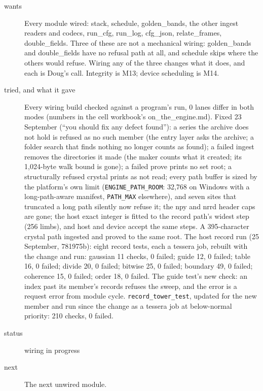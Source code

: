 \begin{description}
\item[{wants}] Every module wired: stack, schedule, golden\_\allowbreak{}bands, the other ingest readers and codecs, run\_\allowbreak{}cfg, run\_\allowbreak{}log, cfg\_\allowbreak{}json, relate\_\allowbreak{}frames, double\_\allowbreak{}fields. Three of these are not a mechanical wiring: golden\_\allowbreak{}bands and double\_\allowbreak{}fields have no refusal path at all, and schedule skips where the others would refuse. Wiring any of the three changes what it does, and each is Doug's call. Integrity is M13; device scheduling is M14.
\item[{tried, and what it gave}] Every wiring build checked against a program's run, 0 lanes differ in both modes (numbers in the cell workbook's on\_\allowbreak{}the\_\allowbreak{}engine.md). Fixed 23 September (“you should fix any defect found”): a series the archive does not hold is refused as no such member (the entry layer asks the archive; a folder search that finds nothing no longer counts as found); a failed ingest removes the directories it made (the maker counts what it created; its 1,024-byte walk bound is gone); a failed prove prints no set root; a structurally refused crystal prints as not read; every path buffer is sized by the platform's own limit (\texttt{ENGINE\_\allowbreak{}PATH\_\allowbreak{}ROOM}: 32,768 on Windows with a long-path-aware manifest, \texttt{PATH\_\allowbreak{}MAX} elsewhere), and seven sites that truncated a long path silently now refuse it; the npy and nrrd header caps are gone; the host exact integer is fitted to the record path's widest step (256 limbs), and host and device accept the same steps. A 395-character crystal path ingested and proved to the same root. The host record run (25 September, 781975b): eight record tests, each a tessera job, rebuilt with the change and run: gaussian 11 checks, 0 failed; guide 12, 0 failed; table 16, 0 failed; divide 20, 0 failed; bitwise 25, 0 failed; boundary 49, 0 failed; coherence 15, 0 failed; order 18, 0 failed. The guide test's new check: an index past its member's records refuses the sweep, and the error is a request error from module cycle. \texttt{record\_\allowbreak{}tower\_\allowbreak{}test}, updated for the new member and run since the change as a tessera job at below-normal priority: 210 checks, 0 failed.
\item[{status}] wiring in progress
\item[{next}] The next unwired module.
\end{description}

